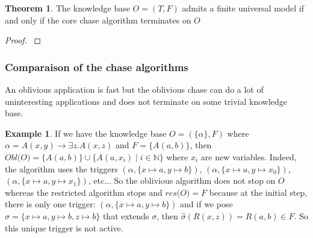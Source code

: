 \documentclass{article}
\theoremstyle{definition}
\newtheorem{theorem}{Theorem}[section]
\newtheorem{example}{Example}[section]
\theoremstyle{remark}
\def \N {\mathbb N}
\begin{document}
\begin{theorem}
The knowledge base $O = (T,F)$ admits a finite universal model if and only if the core chase algorithm terminates on $O$
\end{theorem}

\begin{proof}
\cite{core_chase}
\end{proof}

\subsubsection{Comparaison of the chase algorithms}

An oblivious application is fast but the oblivious chase  can do a lot of uninteresting applications and does not terminate on some trivial knowledge base. 
\begin{example}
If we have the knowledge base $O=(\{\alpha\},F)$ where $\alpha = A(x,y) \rightarrow \exists z.A(x,z)$ and $F =  \{A(a,b)\}$, then $\textit{Obl(O)}= \{A(a,b)\}\cup\{A(a,x_i) \mid i \in \N\}$ where $x_i$ are new variables. Indeed, the algorithm uses the triggers $(\alpha, \{x \mapsto a, y \mapsto b\})$, $(\alpha, \{x \mapsto a, y \mapsto x_0\})$,$(\alpha, \{x \mapsto a, y \mapsto x_1\})$, etc...
So the oblivious algorithm does not stop on $O$ whereas the restricted algorithm stops and $\textit{res(O)} = F$ because at the initial step, there is only one trigger: $(\alpha, \{x \mapsto a, y \mapsto b\})$ and if we pose $\hat \sigma = \{x \mapsto a, y \mapsto b, z \mapsto b\}$ that extends $\sigma$, then $\hat \sigma(R(x,z))=R(a,b) \in F$. So this unique trigger is not active.
\end{example}
\end{document}
